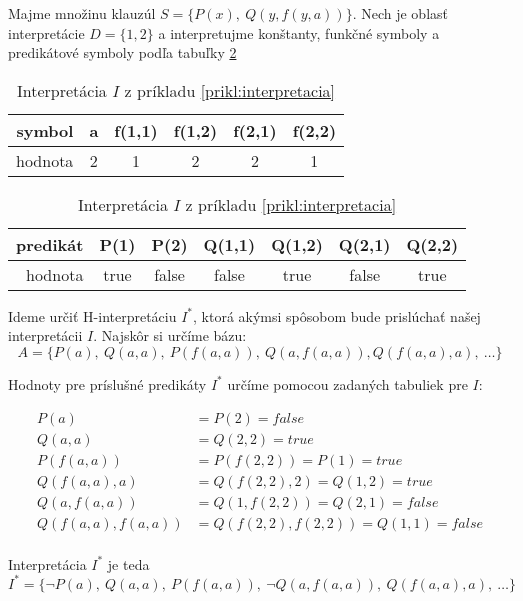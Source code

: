 \begin{priklad}
    \label{prikl:interpretacia}
    Majme množinu klauzúl $S = \{ P(x),\ Q(y, f(y,a)) \}$.
    Nech je oblasť interpretácie $D = \{1,2\}$ a interpretujme
    konštanty, funkčné symboly a predikátové symboly podľa tabuľky
    \ref{tab:priklad-interpretacia}

    \begin{table}[h]
        \centering
        \begin{tabular}{|r||c|c|c|c|c|}
            \hline
            symbol & a & f(1,1) & f(1,2) & f(2,1) & f(2,2) \\
            \hline
            hodnota & 2 & 1 & 2 & 2 & 1 \\
            \hline
        \end{tabular}
        
        \medskip
        \begin{tabular}{|r||c|c|c|c|c|c|}
            \hline
            predikát & P(1) & P(2) & Q(1,1) & Q(1,2) & Q(2,1) & Q(2,2) \\
            \hline
            hodnota & true & false & false & true & false & true \\
            \hline
        \end{tabular}
        \caption{Interpretácia $I$ z príkladu
          \ref{prikl:interpretacia}}
        \label{tab:priklad-interpretacia}
    \end{table}

    Ideme určiť H-interpretáciu $I^*$, ktorá akýmsi spôsobom bude
    prislúchať našej interpretácii $I$. Najskôr si určíme bázu:
    \begin{equation*}
        A=\{ P(a),\ Q(a,a),\ P(f(a,a)),\ Q(a,f(a,a)),
            Q(f(a,a), a),\ \ldots \}
    \end{equation*}

    Hodnoty pre príslušné predikáty $I^*$ určíme pomocou zadaných tabuliek
    pre $I$:

    \begin{align*}
        P(a) &= P(2) = false \\
        Q(a,a) &= Q(2,2) = true\\
        P(f(a,a)) &= P(f(2,2)) = P(1) =true \\
        Q(f(a,a),a) &= Q(f(2,2),2) = Q(1,2) =true \\
        Q(a,f(a,a)) &= Q(1,f(2,2)) = Q(2,1) =false \\
        Q(f(a,a),f(a,a)) &= Q(f(2,2), f(2,2)) = Q(1,1) =false \\
    \end{align*}

    Interpretácia $I^*$ je teda
    \begin{equation*}
        I^* = \{ \neg P(a),\ Q(a,a),\ P(f(a,a)),\ 
            \neg Q(a,f(a,a)),\ Q(f(a,a),a),\ \ldots \}
    \end{equation*}
\end{priklad}

